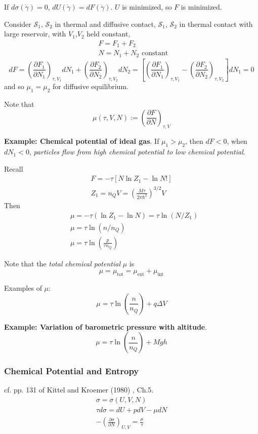If $d\sigma(\dot{\gamma})=0$, $dU(\dot{\gamma}) = dF(\dot{\gamma})$.  $U$ is minimized, so $F$ is minimized.  

Consider $\mathcal{S}_1$, $\mathcal{S}_2$ in thermal and diffusive contact, $\mathcal{S}_1$, $\mathcal{S}_2$ in thermal contact with large reservoir, with $V_1$,$V_2$ held constant,
\[
\begin{aligned}
  & F = F_1 + F_2 \\ 
  & N = N_1 + N_2 \text{ constant } 
\end{aligned}
\]
\[
dF = \left( \frac{ \partial F_1}{ \partial N_1} \right)_{\tau,V_1} dN_1 +  \left( \frac{ \partial F_2}{ \partial N_2} \right)_{\tau,V_2} dN_2 = \left[  \left( \frac{ \partial F_1}{ \partial N_1} \right)_{\tau,V_1}  -  \left( \frac{ \partial F_2}{ \partial N_2} \right)_{\tau,V_2} \right] dN_1 = 0 
\]
and so $\mu_1 = \mu_2$ for diffusive equilibrium.  

Note that 
\begin{equation}
  \mu(\tau,V,N) := \left( \frac{ \partial F}{ \partial N} \right)_{\tau,V}
\end{equation}

\textbf{Example: Chemical potential of ideal gas}.  If $\mu_1 > \mu_2$, then $dF <0$, when $dN_1 <0$, \emph{particles flow from high chemical potential to low chemical potential}.  

Recall
\[
\begin{gathered}
  F = -\tau [ N \ln{Z_1} - \ln{N!} ] \\ 
  Z_1 = n_Q V = \left( \frac{M\tau}{2\pi \hbar^2} \right)^{3/2} V
\end{gathered}
\]
Then
\[
\begin{aligned}
  & \mu = -\tau (\ln{Z_1} - \ln{N} ) = \tau \ln{(N/Z_1 ) } \\ 
  & \mu = \tau \ln{ (n/n_Q ) } \\ 
  & \mu = \tau \ln{ \left( \frac{p}{\tau n_Q } \right) }
\end{aligned}
\]

Note that the \emph{total chemical potential} $\mu$ is 
\[
\mu = \mu_{\text{tot}} = \mu_{\text{ext} } + \mu_{\text{int}}
\]

Examples of $\mu$:
\[
\mu = \tau \ln{ \left( \frac{n}{n_Q} \right) } + q\Delta V
\]

\textbf{Example: Variation of barometric pressure with altitude}.  \[
\mu = \tau \ln{ \left( \frac{n}{n_Q} \right) } + Mgh
\]

\subsubsection{Chemical Potential and Entropy} cf. pp. 131 of Kittel and Kroemer (1980) \cite{CKittelHKroemer1980}, Ch.5.  
\[
\begin{gathered}
  \sigma = \sigma(U,V,N) \\ 
  \tau d\sigma = dU + pdV - \mu dN \\
  - \left( \frac{ \partial \sigma }{ \partial N} \right)_{U,V} = \frac{\mu}{\tau}
\end{gathered}
\]

